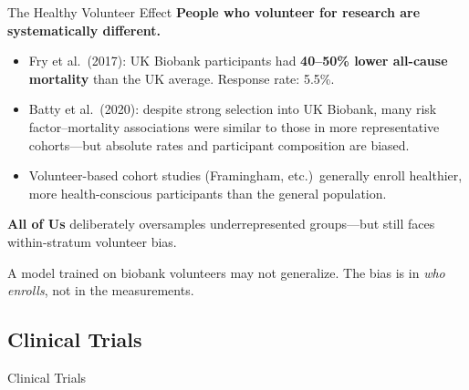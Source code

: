\documentclass[aspectratio=169,10pt]{beamer}
\begin{document}
\begin{frame}{The Healthy Volunteer Effect}
\textbf{People who volunteer for research are systematically different.}

\vspace{0.2em}
\begin{itemize}
    \item Fry et al.\ (2017): UK Biobank participants had \textbf{40--50\% lower all-cause mortality} than the UK average. Response rate: 5.5\%.
    \item Batty et al.\ (2020): despite strong selection into UK Biobank, many risk factor--mortality associations were similar to those in more representative cohorts---but absolute rates and participant composition are biased.
    \item Volunteer-based cohort studies (Framingham, etc.)\ generally enroll healthier, more health-conscious participants than the general population.
\end{itemize}

\vspace{0.2em}
\pause
\textbf{All of Us} deliberately oversamples underrepresented groups---but still faces within-stratum volunteer bias.

\vspace{0.1em}
A model trained on biobank volunteers may not generalize. The bias is in \emph{who enrolls}, not in the measurements.
\end{frame}

\subsection{Clinical Trials}

\begin{frame}[standout]
    Clinical Trials
\end{frame}
\end{document}
